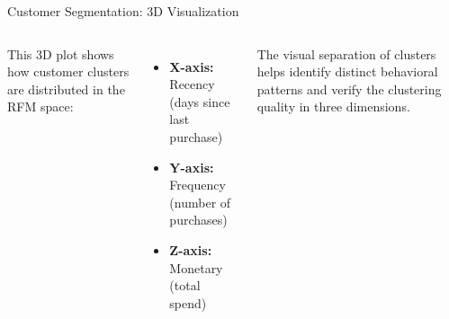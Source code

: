 \documentclass[aspectratio=169, table]{beamer}
\begin{document}
\begin{frame}{Customer Segmentation: 3D Visualization}
	\vspace{20pt}
	\begin{columns}[c]
		\small
		This 3D plot shows how customer clusters are distributed in the RFM space:
		\begin{itemize}
			\item \textbf{X-axis:} Recency (days since last purchase)
			\item \textbf{Y-axis:} Frequency (number of purchases)
			\item \textbf{Z-axis:} Monetary (total spend)
		\end{itemize}
		\vspace{4pt}
		The visual separation of clusters helps identify distinct behavioral patterns and verify the clustering quality in three dimensions.
		
		\centering
	\end{columns}
\end{frame}
\end{document}
